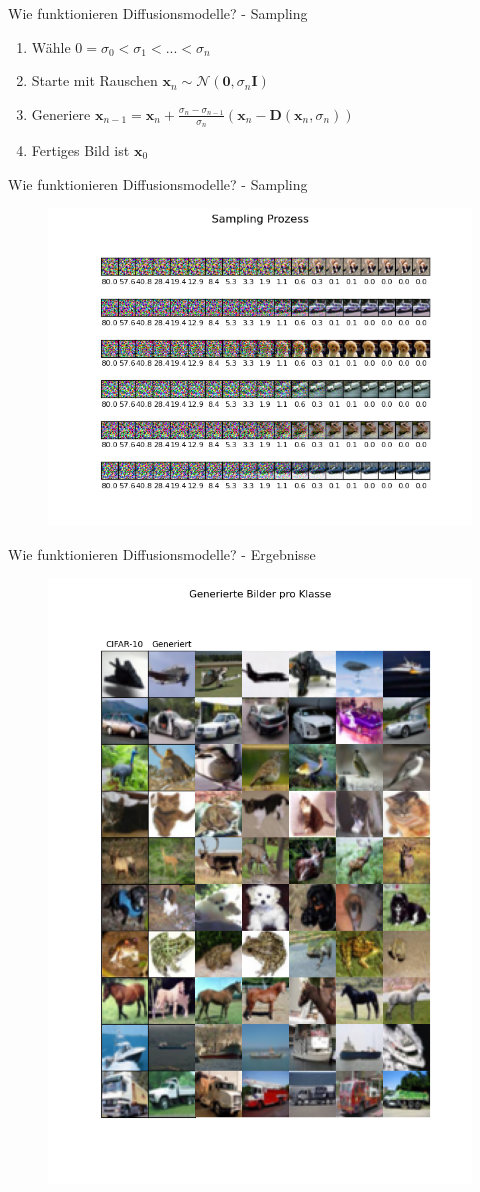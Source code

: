\begin{frame}{Wie funktionieren Diffusionsmodelle? - Sampling}
	\begin{enumerate}
		\item Wähle $0 = \sigma_0 < \sigma_1 < ... < \sigma_n$
		\item Starte mit Rauschen $\boldsymbol x_n \sim \mathcal{N}(\boldsymbol 0, \sigma_n \boldsymbol I)$ 
		\item Generiere $\boldsymbol x_{n-1} = \boldsymbol x_n + \frac{\sigma_n - \sigma_{n-1}}{\sigma_n} \left (\boldsymbol x_n - \boldsymbol D(\boldsymbol x_n, \sigma_n) \right )$
		\item Fertiges Bild ist $\boldsymbol x_0$
	\end{enumerate}
\end{frame}
\begin{frame}{Wie funktionieren Diffusionsmodelle? - Sampling}
\vspace*{\fill}
\begin{figure}
	\includegraphics[width=.7\textwidth, trim={0 1cm 0 1.5cm}, clip]{imgs/denoising.png}
\end{figure}    
\vspace*{\fill}
\end{frame}
\begin{frame}{Wie funktionieren Diffusionsmodelle? - Ergebnisse}
\vspace*{\fill}
\begin{figure}
	\includegraphics[width=.35\textwidth, trim={0 3cm 0 1.5cm}, clip]{imgs/generated_images.png}
\end{figure}    
\vspace*{\fill}
\end{frame}
